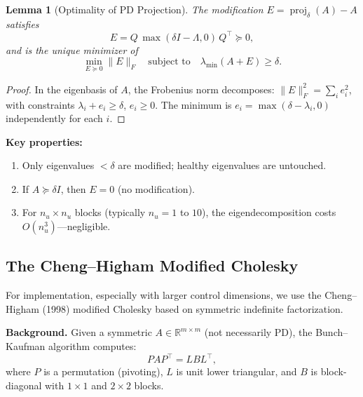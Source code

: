 \documentclass[11pt]{article}
\newtheorem{lemma}[theorem]{Lemma}
\DeclareMathOperator{\proj}{proj}
\begin{document}
\begin{lemma}[Optimality of PD Projection]\label{lem:proj}
The modification $E = \proj_\delta(A) - A$ satisfies
\begin{equation}
  E = Q\,\max(\delta I - \Lambda, 0)\,Q^\top \succeq 0,
\end{equation}
and is the \emph{unique minimizer} of
\begin{equation}
  \min_{E \succeq 0} \|E\|_F \quad \text{subject to} \quad
  \lambda_{\min}(A + E) \ge \delta.
\end{equation}
\end{lemma}

\begin{proof}
In the eigenbasis of $A$, the Frobenius norm decomposes:
$\|E\|_F^2 = \sum_i e_i^2$, with constraints $\lambda_i + e_i \ge \delta$,
$e_i \ge 0$. The minimum is $e_i = \max(\delta - \lambda_i, 0)$ independently
for each $i$.
\end{proof}

\textbf{Key properties:}
\begin{enumerate}
  \item Only eigenvalues $< \delta$ are modified; healthy eigenvalues are untouched.
  \item If $A \succeq \delta I$, then $E = 0$ (no modification).
  \item For $n_u \times n_u$ blocks (typically $n_u = 1$ to $10$), the
        eigendecomposition costs $O(n_u^3)$---negligible.
\end{enumerate}


\subsection{The Cheng--Higham Modified Cholesky}

For implementation, especially with larger control dimensions, we use the
Cheng--Higham (1998) modified Cholesky based on symmetric indefinite factorization.

\textbf{Background.} Given a symmetric $A \in \mathbb{R}^{m \times m}$
(not necessarily PD), the Bunch--Kaufman algorithm computes:
\begin{equation}\label{eq:lbl}
  PAP^\top = LBL^\top,
\end{equation}
where $P$ is a permutation (pivoting), $L$ is unit lower triangular, and $B$ is
block-diagonal with $1 \times 1$ and $2 \times 2$ blocks.
\end{document}
